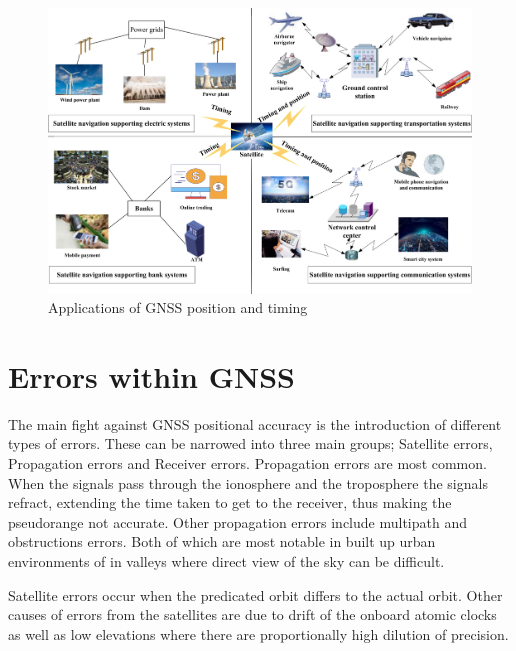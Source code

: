 \begin{figure}[h]
    \begin{centering}
        \includegraphics[width=14cm,keepaspectratio]{Figures/GNSS applications.png}
        \caption{Applications of GNSS position and timing \cite{RN33}}
        \label{fig:GNSS Applications}
    \end{centering}
\end{figure}


\section{Errors within GNSS}
The main fight against GNSS positional accuracy is the introduction of different types of errors. These can be narrowed into three main groups; Satellite errors,
Propagation errors and Receiver errors. Propagation errors are most common. When the signals pass through the ionosphere and the troposphere the signals refract, extending
the time taken to get to the receiver, thus making the pseudorange not accurate. Other propagation errors include multipath and obstructions errors. Both of which are
most notable in built up urban environments of in valleys where direct view of the sky can be difficult.

Satellite errors occur when the predicated orbit differs to the actual orbit. Other causes of errors from the satellites are due to drift of the onboard atomic clocks as
well as low elevations where there are proportionally high dilution of precision.

